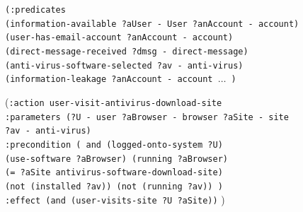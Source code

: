 \documentclass[doctor]{thesis} %
\theoremstyle{plain}
\begin{document}
\begin{figure}[pbt]
{{{{}
\hspace*{35pt}\texttt{(:predicates \\
\hspace*{35pt}(information-available ?aUser - User ?anAccount - account) \\
\hspace*{35pt}(user-has-email-account ?anAccount - account)\\
\hspace*{35pt}(direct-message-received ?dmsg - direct-message)\\
\hspace*{35pt}(anti-virus-software-selected ?av - anti-virus) \\
\hspace*{35pt}(information-leakage ?anAccount - account $\ldots$ )\\[15pt]
}

\hspace*{35pt}(\texttt{:action user-visit-antivirus-download-site}\\
\hspace*{35pt}\texttt{:parameters (?U - user ?aBrowser - browser ?aSite - site \\\hspace*{35pt} ?av - anti-virus)}\\
\hspace*{35pt}\texttt{:precondition ( and (logged-onto-system ?U) \\\hspace*{35pt} (use-software ?aBrowser) (running ?aBrowser) \\\hspace*{35pt} (= ?aSite antivirus-software-download-site) \\\hspace*{35pt} (not (installed ?av))  (not (running ?av)) )}\\
\hspace*{35pt}\texttt{:effect (and (user-visits-site ?U ?aSite))}
)\\[15pt]

}}}
\end{figure}
\end{document}
